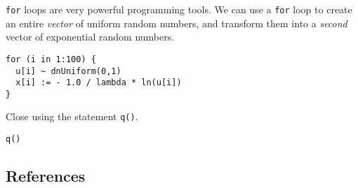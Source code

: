 \noindent \texttt{for} loops are very powerful programming tools.
We can use a \texttt{for} loop to create an entire \emph{vector} of uniform random numbers, and transform them into a \emph{second} vector of exponential random numbers.
{\tt \begin{snugshade*}
\begin{lstlisting}    
for (i in 1:100) {
  u[i] ~ dnUniform(0,1)
  x[i] := - 1.0 / lambda * ln(u[i])
}
\end{lstlisting}
\end{snugshade*}}

\noindent Close \Rev using the statement \texttt{q()}.
{\tt \begin{snugshade*}
\begin{lstlisting}    
q()
\end{lstlisting}
\end{snugshade*}}

\subsection{References}



